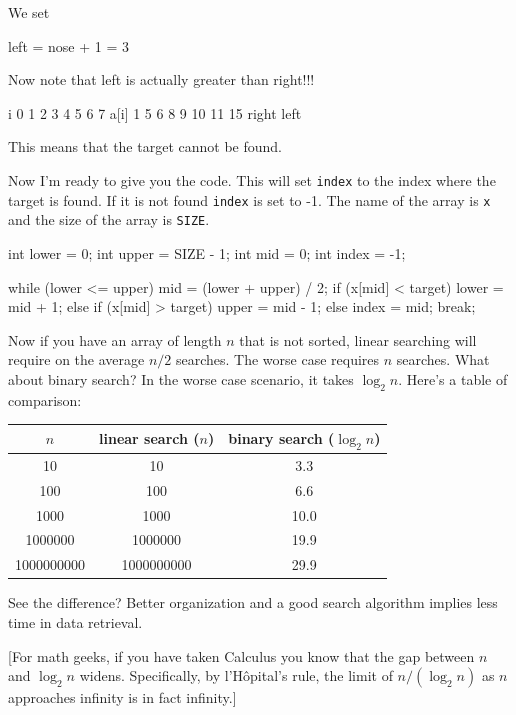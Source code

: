 We set
\begin{center}
left = nose + 1 = 3
\end{center}
Now note that left is actually greater than right!!!

\begin{consolethree}[escapeinside=||]
i      0    1    2    3    4    5    6    7
a[i]   1    5    6    8    9    10   11   15
               right left
\end{consolethree}

This means that the target cannot be found.

Now I'm ready to give you the code. This will set \texttt{index} to the index where the target is found. If it is not found \texttt{index} is set to -1. The name of the array is \texttt{x} and the size of the array is \texttt{SIZE}.

\begin{consolethree}[escapeinside=||]
int lower = 0;
int upper = SIZE - 1;
int mid = 0;
int index = -1;

while (lower <= upper)
{
    mid = (lower + upper) / 2;
    if (x[mid] < target)
    {
        lower = mid + 1;
    }
    else if (x[mid] > target)
    {
        upper = mid - 1;
    }
    else
    {
        index = mid;
        break;
    }
}
\end{consolethree}

Now if you have an array of length $n$ that is not sorted, linear searching will require on the average $n/2$ searches. The worse case requires $n$ searches. What about binary search? In the worse case scenario, it takes $\log_{2}n$. Here's a table of comparison:

\begin{center}
\begin{tabular}{|c|c|c|}
\hline
$n$ & linear search ($n$) & binary search ($\log_{2}n$) \\
\hline
10 & 10 & 3.3 \\
100 & 100 & 6.6 \\
1000 & 1000 & 10.0 \\
1000000 & 1000000 & 19.9 \\
1000000000 & 1000000000 & 29.9 \\
\hline
\end{tabular}
\end{center}

See the difference? Better organization and a good search algorithm implies less time in data retrieval.

[For math geeks, if you have taken Calculus you know that the gap between $n$ and $\log_{2}n$ widens. Specifically, by l'H\^{o}pital's rule, the limit of $n/(\log_{2}n)$ as $n$ approaches infinity is in fact infinity.]

